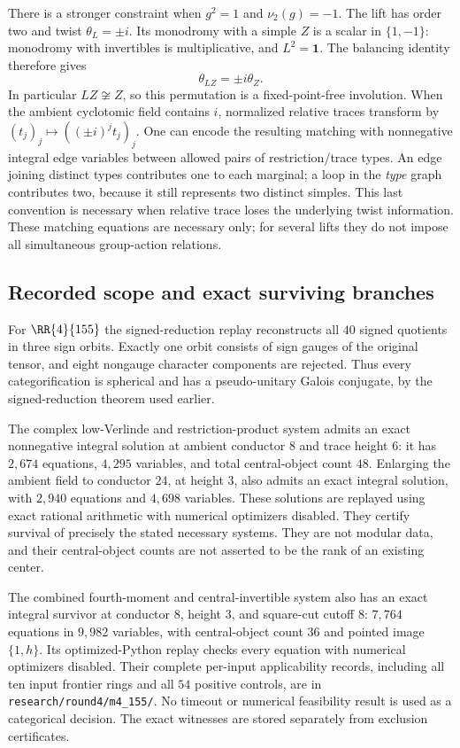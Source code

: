 There is a stronger constraint when $g^2=1$ and $\nu_2(g)=-1$.
The lift has order two and twist $\theta_L=\pm i$. Its monodromy with a
simple $Z$ is a scalar in $\{1,-1\}$: monodromy with invertibles is
multiplicative, and $L^2=\mathbf1$. The balancing identity therefore gives
\[
 \theta_{LZ}=\pm i\theta_Z.
\]
In particular $LZ\not\cong Z$, so this permutation is a fixed-point-free
involution. When the ambient cyclotomic field contains $i$, normalized
relative traces transform by
$(t_j)_j\mapsto((\pm i)^j t_j)_j$.
One can encode the resulting matching with nonnegative integral edge
variables between allowed pairs of restriction/trace types. An edge
joining distinct types contributes one to each marginal; a loop in the
\emph{type} graph contributes two, because it still represents two distinct
simples. This last convention is necessary when relative trace loses the
underlying twist information. These matching equations are necessary only;
for several lifts they do not impose all simultaneous group-action
relations.

\subsection{Recorded scope and exact surviving branches}
For $\RR{4}{155}$ the signed-reduction replay reconstructs all $40$ signed
quotients in three sign orbits. Exactly one orbit consists of sign gauges
of the original tensor, and eight nongauge character components are
rejected. Thus every categorification is spherical and has a pseudo-unitary
Galois conjugate, by the signed-reduction theorem used earlier.

The complex low-Verlinde and restriction-product system admits an exact
nonnegative integral solution at ambient conductor $8$ and trace height
$6$: it has $2,674$ equations, $4,295$ variables, and total central-object
count $48$. Enlarging the ambient field to conductor $24$, at height $3$,
also admits an exact integral solution, with $2,940$ equations and $4,698$
variables. These solutions are replayed using exact rational arithmetic
with numerical optimizers disabled. They certify survival of precisely
the stated necessary systems. They are not modular data, and their
central-object counts are not asserted to be the rank of an existing
center.

The combined fourth-moment and central-invertible system also has an
exact integral survivor at conductor $8$, height $3$, and square-cut
cutoff $8$: $7,764$ equations in $9,982$ variables, with central-object
count $36$ and pointed image $\{1,h\}$. Its optimized-Python replay
checks every equation with numerical optimizers disabled. Their complete
per-input applicability records, including all ten input frontier rings
and all $54$ positive controls, are in
\texttt{research/round4/m4\_155/}. No timeout or numerical feasibility
result is used as a categorical decision. The exact witnesses are stored
separately from exclusion certificates.
